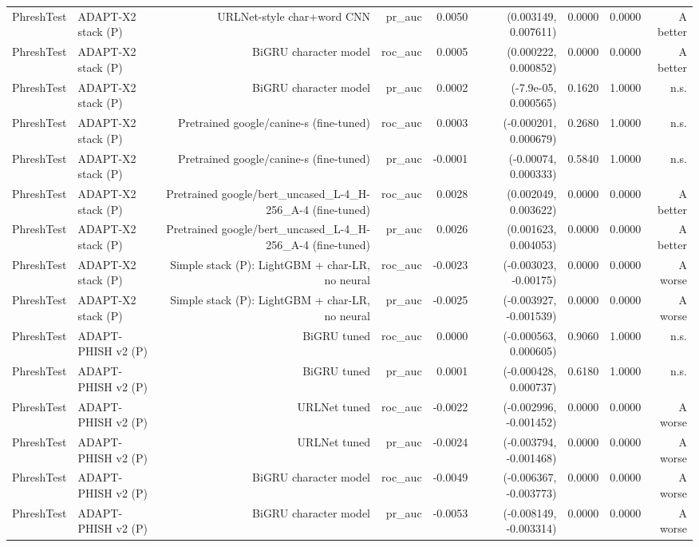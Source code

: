 \begin{table}[t]
\begin{tabular}{llrrrrrrr}
PhreshTest & ADAPT-X2 stack (P) & URLNet-style char+word CNN & pr\_auc & 0.0050 & (0.003149, 0.007611) & 0.0000 & 0.0000 & A better \\
PhreshTest & ADAPT-X2 stack (P) & BiGRU character model & roc\_auc & 0.0005 & (0.000222, 0.000852) & 0.0000 & 0.0000 & A better \\
PhreshTest & ADAPT-X2 stack (P) & BiGRU character model & pr\_auc & 0.0002 & (-7.9e-05, 0.000565) & 0.1620 & 1.0000 & n.s. \\
PhreshTest & ADAPT-X2 stack (P) & Pretrained google/canine-s (fine-tuned) & roc\_auc & 0.0003 & (-0.000201, 0.000679) & 0.2680 & 1.0000 & n.s. \\
PhreshTest & ADAPT-X2 stack (P) & Pretrained google/canine-s (fine-tuned) & pr\_auc & -0.0001 & (-0.00074, 0.000333) & 0.5840 & 1.0000 & n.s. \\
PhreshTest & ADAPT-X2 stack (P) & Pretrained google/bert\_uncased\_L-4\_H-256\_A-4 (fine-tuned) & roc\_auc & 0.0028 & (0.002049, 0.003622) & 0.0000 & 0.0000 & A better \\
PhreshTest & ADAPT-X2 stack (P) & Pretrained google/bert\_uncased\_L-4\_H-256\_A-4 (fine-tuned) & pr\_auc & 0.0026 & (0.001623, 0.004053) & 0.0000 & 0.0000 & A better \\
PhreshTest & ADAPT-X2 stack (P) & Simple stack (P): LightGBM + char-LR, no neural & roc\_auc & -0.0023 & (-0.003023, -0.00175) & 0.0000 & 0.0000 & A worse \\
PhreshTest & ADAPT-X2 stack (P) & Simple stack (P): LightGBM + char-LR, no neural & pr\_auc & -0.0025 & (-0.003927, -0.001539) & 0.0000 & 0.0000 & A worse \\
PhreshTest & ADAPT-PHISH v2 (P) & BiGRU tuned & roc\_auc & 0.0000 & (-0.000563, 0.000605) & 0.9060 & 1.0000 & n.s. \\
PhreshTest & ADAPT-PHISH v2 (P) & BiGRU tuned & pr\_auc & 0.0001 & (-0.000428, 0.000737) & 0.6180 & 1.0000 & n.s. \\
PhreshTest & ADAPT-PHISH v2 (P) & URLNet tuned & roc\_auc & -0.0022 & (-0.002996, -0.001452) & 0.0000 & 0.0000 & A worse \\
PhreshTest & ADAPT-PHISH v2 (P) & URLNet tuned & pr\_auc & -0.0024 & (-0.003794, -0.001468) & 0.0000 & 0.0000 & A worse \\
PhreshTest & ADAPT-PHISH v2 (P) & BiGRU character model & roc\_auc & -0.0049 & (-0.006367, -0.003773) & 0.0000 & 0.0000 & A worse \\
PhreshTest & ADAPT-PHISH v2 (P) & BiGRU character model & pr\_auc & -0.0053 & (-0.008149, -0.003314) & 0.0000 & 0.0000 & A worse \\

\end{tabular}
\end{table}
